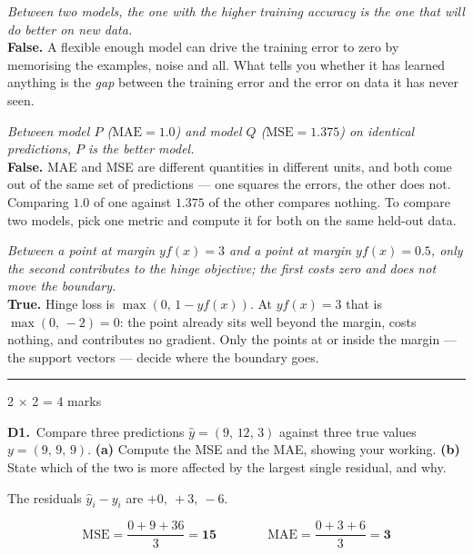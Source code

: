 \documentclass[10pt,a4paper]{article}
\newcommand{\parthead}[2]{\vspace{2pt}\noindent\rule{\linewidth}{0.4pt}\par\vspace{2pt}%
  \noindent{\bfseries Part #1}\hfill{\small #2}\par\vspace{1pt}}
\newcommand{\sol}[1]{\textbf{#1}}
\begin{document}
\begin{sC}

  \item \emph{Between two models, the one with the higher training accuracy is the one that will do better on new data.}\\[2pt] \textbf{False.} A flexible enough model can drive the training error to zero by memorising the examples, noise and all. What tells you whether it has learned anything is the \emph{gap} between the training error and the error on data it has never seen.

  \item \emph{Between model $P$ ($\mathrm{MAE} = 1.0$) and model $Q$ ($\mathrm{MSE} = 1.375$) on identical predictions, $P$ is the better model.}\\[2pt] \textbf{False.} MAE and MSE are different quantities in different units, and both come out of the same set of predictions --- one squares the errors, the other does not. Comparing $1.0$ of one against $1.375$ of the other compares nothing. To compare two models, pick one metric and compute it for both on the same held-out data.

  \item \emph{Between a point at margin $y f(x) = 3$ and a point at margin $y f(x) = 0.5$, only the second contributes to the hinge objective; the first costs zero and does not move the boundary.}\\[2pt] \textbf{True.} Hinge loss is $\max(0,\,1 - y f(x))$. At $y f(x) = 3$ that is $\max(0,\,-2) = 0$: the point already sits well beyond the margin, costs nothing, and contributes no gradient. Only the points at or inside the margin --- the support vectors --- decide where the boundary goes.

\end{sC}

\newpage

\parthead{D --- Short answer}{2 $\times$ 2 = 4 marks}

\textbf{D1.}\ Compare three predictions $\hat{y} = (9,\,12,\,3)$ against three true values $y = (9,\,9,\,9)$. \textbf{(a)} Compute the MSE and the MAE, showing your working. \textbf{(b)} State which of the two is more affected by the largest single residual, and why.

\vspace{2pt}

The residuals $\hat y_i - y_i$ are $+0,\ +3,\ -6$.

\[ \mathrm{MSE} = \frac{0 + 9 + 36}{3} = \sol{15} \qquad\qquad \mathrm{MAE} = \frac{0 + 3 + 6}{3} = \sol{3} \]
\end{document}

